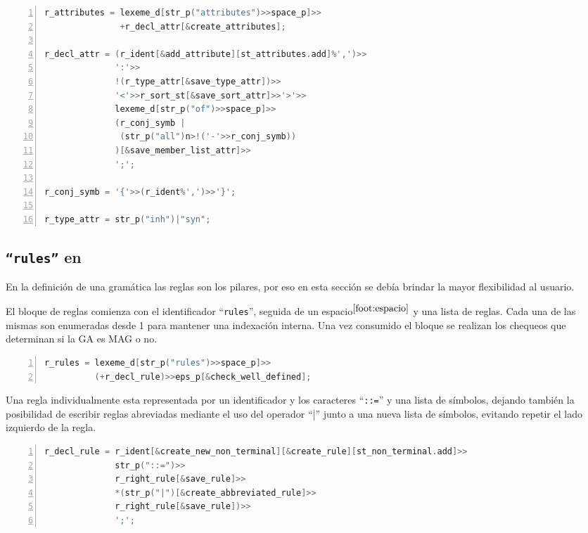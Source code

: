\begin{lstlisting}[language=C++, basicstyle=\scriptsize, numbers=left, numbersep=5pt, numberstyle=\tiny]
r_attributes = lexeme_d[str_p("attributes")>>space_p]>>
               +r_decl_attr[&create_attributes];

r_decl_attr = (r_ident[&add_attribute][st_attributes.add]%',')>>
              ':'>>
              !(r_type_attr[&save_type_attr])>>
              '<'>>r_sort_st[&save_sort_attr]>>'>'>>
              lexeme_d[str_p("of")>>space_p]>>
              (r_conj_symb |
               (str_p("all")n>!('-'>>r_conj_symb))
              )[&save_member_list_attr]>>
              ';';

r_conj_symb = '{'>>(r_ident%',')>>'}';

r_type_attr = str_p("inh")|"syn";
\end{lstlisting}

\subsection{\texttt{``rules''} en \spirit}

En la definición de una gramática las reglas son los pilares, por eso en esta sección se debía brindar la mayor flexibilidad al usuario.

El bloque de reglas comienza con el identificador ``\texttt{rules}'', seguida de un espacio$^{\ref{foot:espacio}}$ y una lista de reglas. Cada una de las mismas son enumeradas desde 1 para mantener una indexación interna. Una vez consumido el bloque se realizan los chequeos que determinan si la GA es MAG o no.

\begin{lstlisting}[language=C++, basicstyle=\scriptsize, numbers=left, numbersep=5pt, numberstyle=\tiny]
r_rules = lexeme_d[str_p("rules")>>space_p]>>
          (+r_decl_rule)>>eps_p[&check_well_defined];
\end{lstlisting}

Una regla individualmente esta representada por un identificador y los caracteres ``\texttt{::=}'' y una lista de símbolos, dejando también la posibilidad de escribir reglas abreviadas mediante el uso del operador ``|'' junto a una nueva lista de símbolos, evitando repetir el lado izquierdo de la regla.

\begin{lstlisting}[language=C++, basicstyle=\scriptsize, numbers=left, numbersep=5pt, numberstyle=\tiny]
r_decl_rule = r_ident[&create_new_non_terminal][&create_rule][st_non_terminal.add]>>
              str_p("::=")>>
              r_right_rule[&save_rule]>>
              *(str_p("|")[&create_abbreviated_rule]>>
              r_right_rule[&save_rule])>>
              ';';
\end{lstlisting}


